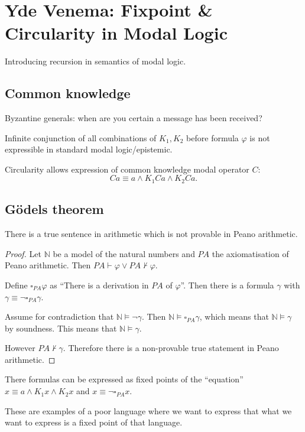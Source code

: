 \section{Yde Venema: Fixpoint \& Circularity in Modal Logic}

Introducing recursion in semantics of modal logic.

\subsection{Common knowledge}
Byzantine generals: when are you certain a message has been received?

Infinite conjunction of all combinations of \(K_{1},K_{2}\) before formula
\(\varphi\) is not expressible in standard modal logic/epistemic.

Circularity allows expression of common knowledge modal operator \(C\):
\[
    Ca\equiv a\wedge K_{1}Ca\wedge K_{2}Ca.
\]

\subsection{Gödels theorem}
There is a true sentence in arithmetic which is not provable in Peano
arithmetic.

\begin{proof}
    Let \(\mathbb{N}\) be a model of the natural numbers and \(PA\) the
    axiomatisation of Peano arithmetic. Then \(PA\vdash\varphi\vee
    PA\nvdash\varphi\).

    Define \(\square_{PA}\varphi\) as ``There is a derivation in \(PA\) of
    \(\varphi\)''. Then there is a formula \(\gamma\) with \(\gamma\equiv
    \neg\square_{PA}\gamma\).

    Assume for contradiction that \(\mathbb{N}\models\neg\gamma\).
    Then \(\mathbb{N}\models\square_{PA}\gamma\), which means that
    \(\mathbb{N}\models\gamma\) by soundness. This means that
    \(\mathbb{N}\models\gamma\).

    However \(PA\nvdash\gamma\). Therefore there is a non-provable true
    statement in Peano arithmetic.
\end{proof}

There formulas can be expressed as fixed points of the ``equation'' \(x\equiv
a\wedge K_{1}x\wedge K_{2}x\) and \(x\equiv\neg\square_{PA}x\).

These are examples of a poor language where we want to express that what we want
to express is a fixed point of that language.

